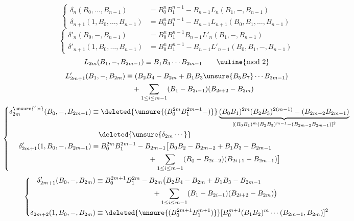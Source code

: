 \[
\left\{\begin{aligned}
\delta_n(B_0,\ldots,B_{n-1})
&=B_0^nB_1^{n-1}\mathbin{-}B_{n-1}L_n(B_1,\mathbin{-},B_{n-1})\\
\delta_{n+1}(1,B_0,\ldots,B_{n-1})
&=B_0^nB_1^{n-1}\mathbin{-}B_{n-1}L_{n+1}(B_0,B_1,\ldots,B_{n-1})
\end{aligned}\right.
\]
\[
\left\{\begin{aligned}
\delta'_n(B_0,\mathbin{-},B_{n-1})
&=B_0^nB_1^{n-1}B_{n-1}L'_n(B_1,\mathbin{-},B_{n-1})\\
\delta'_{n+1}(1,B_0,\ldots,B_{n-1})
&=B_0^nB_1^{n-1}\mathbin{-}B_{n-1}L'_{n+1}(B_0,B_1,\mathbin{-},B_{n-1})
\end{aligned}\right.
\]
\[
L_{2m}(B_1,\mathbin{-},B_{2m-1})
\equiv B_1B_3\cdots B_{2m-1}
\qquad\uuline{\text{mod }2}
\]
\[
\begin{aligned}
L'_{2m+1}(B_1,\mathbin{-},B_{2m})
&\equiv(B_2B_4\mathbin{-}B_{2m}
+B_1B_3\unsure{B_5B_7}\cdots B_{2m-1})\\
&\quad+\sum_{1\leq i\leq m-1}
(B_1\mathbin{-}B_{2i-1})(B_{2i+2}\mathbin{-}B_{2m})
\end{aligned}
\]
\[
\left\{\begin{aligned}
\delta_{2m}^{\unsure{'|*}}(B_0,\mathbin{-},B_{2m-1})
&\equiv
\deleted{\unsure{(B_0^{2m}B_1^{2m-1}\mathbin{-})}}
\underbrace{(B_0B_1)^{2m}(B_2B_3)^{2(m-1)}
\mathbin{-}(B_{2m-2}B_{2m-1})}_{
[(B_0B_1)^m(B_2B_3)^{m-1}\mathbin{-}(B_{2m-2}B_{2m-1})]^2}\\
&\quad\deleted{\unsure{\delta_{2m}\cdots}}\\
\delta'_{2m+1}(1,B_0,\mathbin{-},B_{2m-1})
&\equiv B_0^{2m}B_1^{2m-1}\mathbin{-}B_{2m-1}
\bigl[B_0B_2\mathbin{-}B_{2m-2}+B_1B_3\mathbin{-}B_{2m-1}\\
&\hspace{8em}+\sum_{1\leq i\leq m-1}
(B_0\mathbin{-}B_{2i-2})(B_{2i+1}\mathbin{-}B_{2m-1})\bigr]
\end{aligned}\right.
\]
\[
\left\{\begin{aligned}
\delta'_{2m+1}(B_0,\mathbin{-},B_{2m})
&\equiv B_0^{2m+1}B_1^{2m}\mathbin{-}B_{2m}
\bigl(B_2B_4\mathbin{-}B_{2m}+B_1B_3\mathbin{-}B_{2m-1}\\
&\hspace{8em}+\sum_{1\leq i\leq m-1}
(B_1\mathbin{-}B_{2i-1})(B_{2i+2}\mathbin{-}B_{2m})\bigr)\\
\delta_{2m+2}(1,B_0,\mathbin{-},B_{2m})
&\equiv\deleted{\unsure{(B_0^{2m+1}B_1^{m+1})}}
[B_0^{m+1}(B_1B_2)^m\cdots(B_{2m-1},B_{2m})]^2
\end{aligned}\right.
\]


